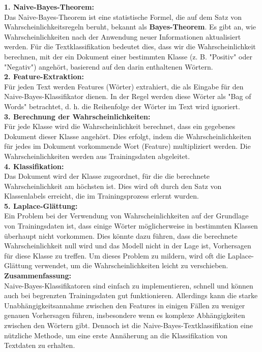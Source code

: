 \documentclass[12pt]{article}
\begin{document}
\textbf{1. Naive-Bayes-Theorem:}\\
Das Naive-Bayes-Theorem ist eine statistische Formel, die auf dem Satz von Wahrscheinlichkeitsregeln beruht, bekannt als \textbf{Bayes-Theorem}. Es gibt an, wie Wahrscheinlichkeiten nach der Anwendung neuer Informationen aktualisiert werden. Für die Textklassifikation bedeutet dies, dass wir die Wahrscheinlichkeit berechnen, mit der ein Dokument einer bestimmten Klasse (z. B. "Positiv" oder "Negativ") angehört, basierend auf den darin enthaltenen Wörtern.\\
\textbf{2. Feature-Extraktion:}\\
Für jeden Text werden Features (Wörter) extrahiert, die als Eingabe für den Naive-Bayes-Klassifikator dienen. In der Regel werden diese Wörter als "Bag of Words" betrachtet, d. h. die Reihenfolge der Wörter im Text wird ignoriert.\\
\textbf{3. Berechnung der Wahrscheinlichkeiten:}\\
Für jede Klasse wird die Wahrscheinlichkeit berechnet, dass ein gegebenes Dokument dieser Klasse angehört. Dies erfolgt, indem die Wahrscheinlichkeiten für jedes im Dokument vorkommende Wort (Feature) multipliziert werden. Die Wahrscheinlichkeiten werden aus Trainingsdaten abgeleitet.\\
\textbf{4. Klassifikation:}\\
Das Dokument wird der Klasse zugeordnet, für die die berechnete Wahrscheinlichkeit am höchsten ist. Dies wird oft durch den Satz von Klassenlabels erreicht, die im Trainingsprozess erlernt wurden.\\
\textbf{5. Laplace-Glättung:}\\
Ein Problem bei der Verwendung von Wahrscheinlichkeiten auf der Grundlage von Trainingsdaten ist, dass einige Wörter möglicherweise in bestimmten Klassen überhaupt nicht vorkommen. Dies könnte dazu führen, dass die berechnete Wahrscheinlichkeit null wird und das Modell nicht in der Lage ist, Vorhersagen für diese Klasse zu treffen. Um dieses Problem zu mildern, wird oft die Laplace-Glättung verwendet, um die Wahrscheinlichkeiten leicht zu verschieben.\\[0.2cm]

\textbf{Zusammenfassung:}\\
Naive-Bayes-Klassifikatoren sind einfach zu implementieren, schnell und können auch bei begrenzten Trainingsdaten gut funktionieren. Allerdings kann die starke Unabhängigkeitsannahme zwischen den Features in einigen Fällen zu weniger genauen Vorhersagen führen, insbesondere wenn es komplexe Abhängigkeiten zwischen den Wörtern gibt. Dennoch ist die Naive-Bayes-Textklassifikation eine nützliche Methode, um eine erste Annäherung an die Klassifikation von Textdaten zu erhalten.\\
\end{document}
